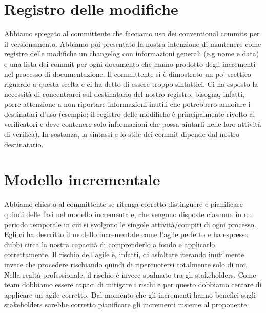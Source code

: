 \documentclass{article}
\begin{document}
\section{Registro delle modifiche}%
\label{sec:registro_delle_modifiche}

Abbiamo spiegato al committente che facciamo uso dei conventional commits per il versionamento. Abbiamo poi presentato la nostra intenzione di mantenere come registro delle modifiche un changelog con informazioni generali (e.g nome e data) e una lista dei commit per ogni documento che hanno prodotto degli incrementi nel processo di documentazione. Il committente si è dimostrato un po' scettico riguardo a questa scelta e ci ha detto di essere troppo sintattici. Ci ha esposto la necessità di concentrarci sul destinatario del nostro registro: bisogna, infatti, porre attenzione a non riportare informazioni inutili che potrebbero annoiare i destinatari d'uso (esempio: il registro delle modifiche è principalmente rivolto ai verificatori e deve contenere solo informazioni che possa aiutarli nelle loro attività di verifica). In sostanza, la sintassi e lo stile dei commit dipende dal nostro destinatario.


\section{Modello incrementale}%
\label{sec:modello_incrementale}

Abbiamo chiesto al committente se ritenga corretto distinguere e pianificare quindi delle fasi nel modello incrementale, che vengono disposte ciascuna in un periodo temporale in cui si svolgono le singole attività/compiti di ogni processo. Egli ci ha descritto il modello incrementale come l'agile perfetto e ha espresso dubbi circa la nostra capacità di comprenderlo a fondo e applicarlo correttamente. Il rischio dell'agile è, infatti, di asfaltare iterando inutilmente invece che procedere rischiando quindi di ripercuotersi totalmente solo di noi. Nella realtà professionale, il rischio è invece spalmato tra gli stakeholders. Come team dobbiamo essere capaci di mitigare i rischi e per questo dobbiamo cercare di applicare un agile corretto. Dal momento che gli incrementi hanno benefici sugli stakeholders sarebbe corretto pianificare gli incrementi insieme al proponente.
\end{document}

